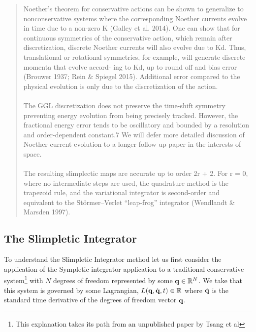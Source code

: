 \documentclass[10pt]{iopart}
\def\SI{Slimpletic Integrator}
\def\SymI{{Sympletic integrator}}
\begin{document}
\begin{quote}
Noether’s theorem for conservative actions can be shown to generalize to nonconservative systems where the corresponding Noether currents evolve in time due to a non-zero K (Galley et al. 2014). One can show that for continuous symmetries of the conservative action, which remain after discretization, discrete Noether currents will also evolve due to Kd. Thus, translational or rotational symmetries, for example, will generate discrete momenta that evolve accord- ing to Kd, up to round off and bias error (Brouwer 1937; Rein \& Spiegel 2015). Additional error compared to the physical evolution is only due to the discretization of the action.
\\\\
The GGL discretization does not preserve the time-shift symmetry preventing energy evolution from being precisely tracked. However, the fractional energy error tends to be oscillatory and bounded by a resolution and order-dependent constant.7 We will defer more detailed discussion of Noether current evolution to a longer follow-up paper in the interests of space.
\\\\
The resulting slimplectic maps are accurate up to order 2r + 2. For r = 0, where no intermediate steps are used, the quadrature method is the trapezoid rule, and the variational integrator is second-order and equivalent to the Störmer–Verlet “leap-frog” integrator (Wendlandt \& Marsden 1997).
\end{quote}





\subsection{The \SI}
\label{sec:intro-si}


To understand the \SI{} method let us first consider the application of the \SymI{} application to a traditional conservative system\footnote{This explanation takes its path from an unpublished paper by Tsang et al\cite{tsangVariationalSymplecticIntegrators}} with $N$ degrees of freedom represented by some $\vb{q} \in \mathbb{R}^N$. We take that this system is governed by some Lagrangian, $L(\vb{q}, \dot{\vb q}, t) \in \mathbb{R}$ where $\dot{\vb q}$ is the standard time derivative of the degrees of freedom vector $\vb q$.
\end{document}
